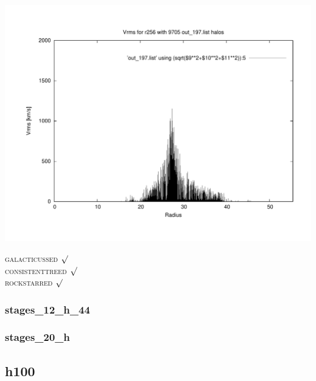 \includegraphics[scale=0.3]{r256/h70/mm_h/plot_Vrms_out_197.pdf}





\textsc{galacticussed} $\surd$ \\
\textsc{consistenttreed} $\surd$ \\
\textsc{rockstarred} $\surd$ \\

% 
%
%
%
%
%
%
%

\newpage

\subsubsection{stages\_12\_h\_44}

\subsubsection{stages\_20\_h}


\subsection{h100}

